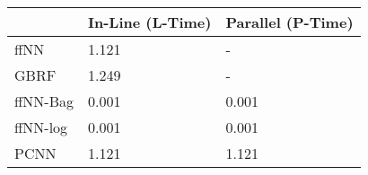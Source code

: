 \begin{tabular}{lll}
\toprule
{} & In-Line (L-Time) & Parallel (P-Time) \\
\midrule
ffNN     &            1.121 &                 - \\
GBRF     &            1.249 &                 - \\
ffNN-Bag &            0.001 &             0.001 \\
ffNN-log &            0.001 &             0.001 \\
PCNN     &            1.121 &             1.121 \\
\bottomrule
\end{tabular}
